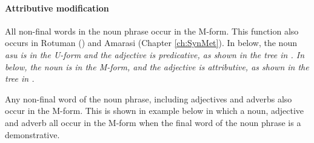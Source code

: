 \paragraph{Attributive modification}\label{sec:LetMod}
All non-final words in the noun phrase occur in the M-form.
This function also occurs in Rotuman ()
and Amarasi (Chapter \ref{ch:SynMet}).
In  below, the noun \it{asu} is in the U-form and the adjective is predicative,
as shown in the tree in .
In  below, the noun is in the M-form,
and the adjective is attributive, as shown in the tree in .

\begin{multicols}{2}
	\begin{exe}\let\eachwordone=\it
		\label{ex:LetAM2}
		\label{ex:LetAM1}
	\end{exe}
\end{multicols}

\begin{multicols}{2}
	\begin{exe}
		\label{tr:LetTre1}
		\label{tr:LetTre2}
	\end{exe}
\end{multicols}

Any non-final word of the noun phrase,
including adjectives and adverbs also occur in the M-form.
This is shown in example  below
in which a noun, adjective and adverb all occur in the M-form
when the final word of the noun phrase is a demonstrative.

